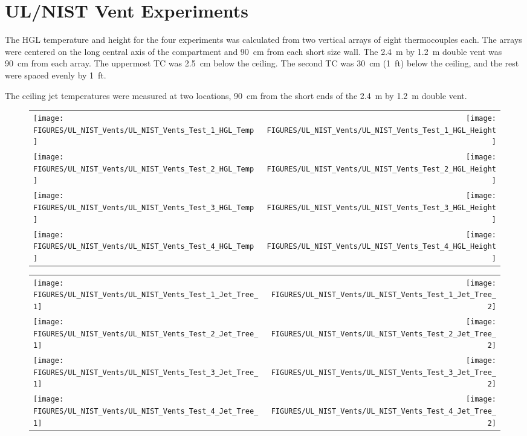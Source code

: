 \clearpage

\section{UL/NIST Vent Experiments}

The HGL temperature and height for the four experiments was calculated from two vertical arrays of eight thermocouples each. The arrays were centered on the long central axis of the compartment and 90~cm from each short size wall. The 2.4~m by 1.2~m double vent was 90~cm from each array. The uppermost TC was 2.5~cm below the ceiling. The second TC was 30~cm (1~ft) below the ceiling, and the rest were spaced evenly by 1~ft.

The ceiling jet temperatures were measured at two locations, 90~cm from the short ends of the 2.4~m by 1.2~m double vent.

\begin{figure}[p]
\begin{tabular*}{\textwidth}{l@{\extracolsep{\fill}}r}
\texttt{[image: FIGURES/UL\_NIST\_Vents/UL\_NIST\_Vents\_Test\_1\_HGL\_Temp]} &
\texttt{[image: FIGURES/UL\_NIST\_Vents/UL\_NIST\_Vents\_Test\_1\_HGL\_Height]} \\
\texttt{[image: FIGURES/UL\_NIST\_Vents/UL\_NIST\_Vents\_Test\_2\_HGL\_Temp]} &
\texttt{[image: FIGURES/UL\_NIST\_Vents/UL\_NIST\_Vents\_Test\_2\_HGL\_Height]} \\
\texttt{[image: FIGURES/UL\_NIST\_Vents/UL\_NIST\_Vents\_Test\_3\_HGL\_Temp]} &
\texttt{[image: FIGURES/UL\_NIST\_Vents/UL\_NIST\_Vents\_Test\_3\_HGL\_Height]} \\
\texttt{[image: FIGURES/UL\_NIST\_Vents/UL\_NIST\_Vents\_Test\_4\_HGL\_Temp]} &
\texttt{[image: FIGURES/UL\_NIST\_Vents/UL\_NIST\_Vents\_Test\_4\_HGL\_Height]}
\end{tabular*}
\end{figure}

\begin{figure}[p]
\begin{tabular*}{\textwidth}{l@{\extracolsep{\fill}}r}
\texttt{[image: FIGURES/UL\_NIST\_Vents/UL\_NIST\_Vents\_Test\_1\_Jet\_Tree\_1]} &
\texttt{[image: FIGURES/UL\_NIST\_Vents/UL\_NIST\_Vents\_Test\_1\_Jet\_Tree\_2]} \\
\texttt{[image: FIGURES/UL\_NIST\_Vents/UL\_NIST\_Vents\_Test\_2\_Jet\_Tree\_1]} &
\texttt{[image: FIGURES/UL\_NIST\_Vents/UL\_NIST\_Vents\_Test\_2\_Jet\_Tree\_2]} \\
\texttt{[image: FIGURES/UL\_NIST\_Vents/UL\_NIST\_Vents\_Test\_3\_Jet\_Tree\_1]} &
\texttt{[image: FIGURES/UL\_NIST\_Vents/UL\_NIST\_Vents\_Test\_3\_Jet\_Tree\_2]} \\
\texttt{[image: FIGURES/UL\_NIST\_Vents/UL\_NIST\_Vents\_Test\_4\_Jet\_Tree\_1]} &
\texttt{[image: FIGURES/UL\_NIST\_Vents/UL\_NIST\_Vents\_Test\_4\_Jet\_Tree\_2]}
\end{tabular*}
\label{UL_NIST_Ceiling_Jet}
\end{figure}



